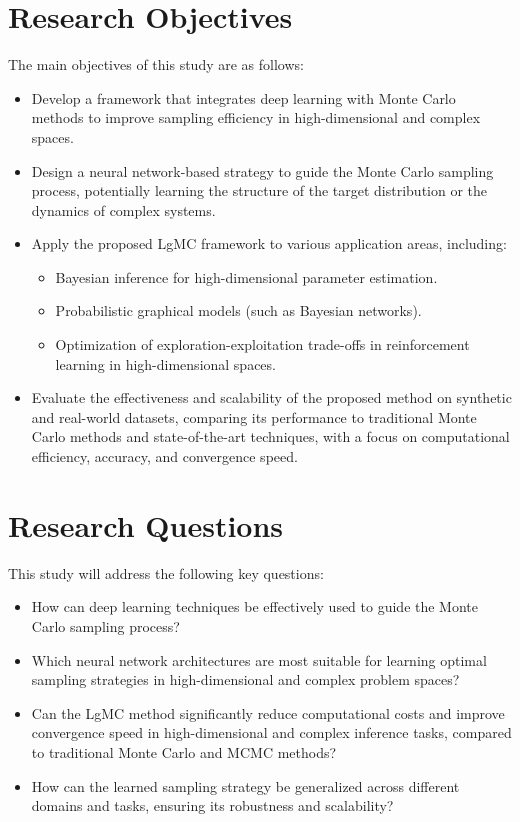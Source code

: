 \documentclass[twocolumn]{article}
\begin{document}
\section{Research Objectives}
The main objectives of this study are as follows:
\begin{itemize}
    \item Develop a framework that integrates deep learning with Monte Carlo methods to improve sampling efficiency in high-dimensional and complex spaces.
    \item Design a neural network-based strategy to guide the Monte Carlo sampling process, potentially learning the structure of the target distribution or the dynamics of complex systems.
    \item Apply the proposed LgMC framework to various application areas, including:
    \begin{itemize}
        \item Bayesian inference for high-dimensional parameter estimation.
        \item Probabilistic graphical models (such as Bayesian networks).
        \item Optimization of exploration-exploitation trade-offs in reinforcement learning in high-dimensional spaces.
    \end{itemize}
    \item Evaluate the effectiveness and scalability of the proposed method on synthetic and real-world datasets, comparing its performance to traditional Monte Carlo methods and state-of-the-art techniques, with a focus on computational efficiency, accuracy, and convergence speed.
\end{itemize}

\section{Research Questions}
This study will address the following key questions:
\begin{itemize}
    \item How can deep learning techniques be effectively used to guide the Monte Carlo sampling process?
    \item Which neural network architectures are most suitable for learning optimal sampling strategies in high-dimensional and complex problem spaces?
    \item Can the LgMC method significantly reduce computational costs and improve convergence speed in high-dimensional and complex inference tasks, compared to traditional Monte Carlo and MCMC methods?
    \item How can the learned sampling strategy be generalized across different domains and tasks, ensuring its robustness and scalability?
\end{itemize}
\end{document}
